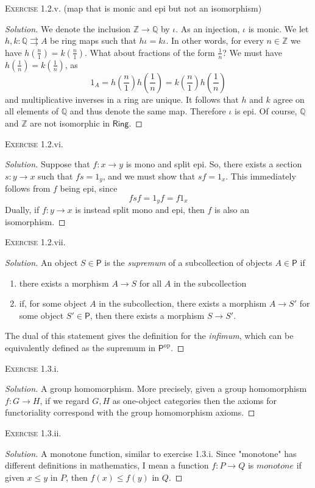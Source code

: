 \documentclass{article}
\newcommand{\Z}{\mathbb{Z}}
\newcommand{\Q}{\mathbb{Q}}
\newcommand{\cat}[1]{\textsf{#1}}
\newenvironment{solution}{\begin{proof}[Solution]}{\end{proof}}
\begin{document}
\noindent \textsc{Exercise} 1.2.v. (map that is monic and epi but not an isomorphism)
\begin{solution}
    We denote the inclusion $\Z \to \Q$ by $\iota$. As an injection, $\iota$ is monic. We let $h,k: \Q \rightrightarrows A$ be ring maps such that $h \iota = k \iota$. In other words, for every $n \in \Z$ we have $h(\frac{n}{1}) = k(\frac{n}{1})$. What about fractions of the form $\frac{1}{n}$? We must have $h(\frac{1}{n}) = k(\frac{1}{n})$, as
    \[
    1_A = h(\frac{n}{1})h(\frac{1}{n}) = k(\frac{n}{1})h(\frac{1}{n})
    \]
    and multiplicative inverses in a ring are unique. It follows that $h$ and $k$ agree on all elements of $\Q$ and thus denote the same map. Therefore $\iota$ is epi. Of course, $\Q$ and $\Z$ are not isomorphic in $\cat{Ring}$.
\end{solution}
\noindent \textsc{Exercise} 1.2.vi. 
\begin{solution}
    Suppose that $f: x \to y$ is mono and split epi. So, there exists a section $s: y \to x$ such that $fs = 1_y$, and we must show that $sf = 1_x$. This immediately follows from $f$ being epi, since 
    \[
    fsf = 1_y f = f 1_x 
    \]
    Dually, if $f: y \to x$ is instead split mono and epi, then $f$ is also an isomorphism.
\end{solution}
\noindent \textsc{Exercise} 1.2.vii. \begin{solution}
An object $S \in \cat{P}$ is the \textit{supremum} of a subcollection of objects $A \in \cat{P}$ if 
\begin{enumerate}
\item there exists a morphism $A \to S$ for all $A$ in the subcollection 
\item if, for some object $A$ in the subcollection, there exists a morphism $A \to S'$ for some object $S' \in \cat{P}$, then there exists a morphism $S \to S'$. 
\end{enumerate}
The dual of this statement gives the definition for the \textit{infimum}, which can be equivalently defined as the supremum in $\cat{P}^{\text{op}}$.
\end{solution}
\noindent \textsc{Exercise} 1.3.i. \begin{solution}
    A group homomorphism. More precisely, given a group homomorphism $f: G 
    \to H$, if we regard $G, H$ as one-object categories then the axioms for functoriality correspond with the group homomorphism axioms. 
\end{solution}
\noindent \textsc{Exercise} 1.3.ii. \begin{solution}
A monotone function, similar to exercise 1.3.i. Since "monotone" has different definitions in mathematics, I mean a function $f: P \to Q$ is $\textit{monotone}$ if given $x \leq y$ in $P$, then $f(x) \leq f(y)$ in $Q$. 
\end{solution}
\end{document}

